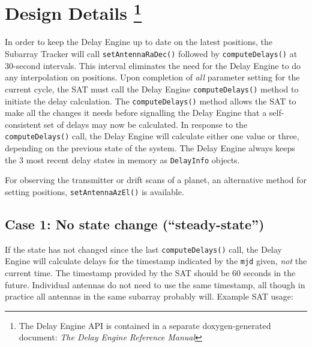 \documentclass[preprint]{aastex}
\begin{document}
\section{Design Details \protect \footnote{The Delay Engine API is contained
in a separate doxygen-generated document: {\sl The Delay Engine Reference
Manual}} }

In order to keep the Delay Engine up to date on the latest positions,
the Subarray Tracker will call {\tt setAntennaRaDec()} followed
by {\tt computeDelays()} at 30-second intervals.  This interval eliminates
the need for the Delay Engine to do any interpolation on positions.
Upon completion of {\em all} parameter setting for the current
cycle, the SAT must call the Delay Engine {\tt computeDelays()} method to
initiate the delay calculation.
The {\tt computeDelays()} method allows the SAT to make all the
changes it needs before signalling the Delay Engine that a self-consistent
set of delays may now be calculated.
In response to the {\tt computeDelays()} call, the Delay Engine will 
calculate either one value or three, depending on the previous state 
of the system.  The Delay Engine always keeps the 3 most recent
delay states in memory as {\tt DelayInfo} objects. 

For observing the transmitter or drift scans of a planet, an alternative
method for setting positions, {\tt setAntennaAzEl()} is available.

\subsection{Case 1: No state change (``steady-state'')}
If the state has not changed since the last
{\tt computeDelays()} call, the Delay Engine will calculate delays for
the timestamp indicated by the {\tt mjd} given, {\em not} the 
current time.  The timestamp provided by the SAT should be 60
seconds in the future.  Individual antennas do not 
need to use the same timestamp, all though in practice all
antennas in the same subarray probably will.
Example SAT usage:
\end{document}
